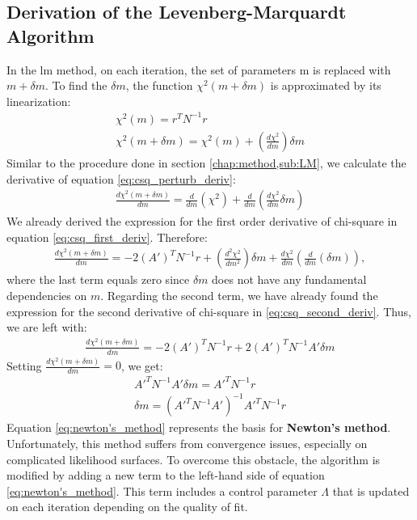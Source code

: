 \documentclass[12pt, TexShade, letterpaper]{report}
\begin{document}
\subsection{Derivation of the Levenberg-Marquardt Algorithm}
In the \gls{lm} method, on each iteration, the set of parameters m is replaced with $m+\delta m$. To find the $\delta m$, the function $\chi^2 (m +\delta m)$ is approximated by its linearization: 
\begin{gather}
    \chi^2 \left(m\right) = r^T N^{-1} r\\
    \chi^2 \left(m + \delta m\right) =  \chi^2 \left(m\right) + \left(\frac{d \chi^2}{dm}\right) \delta m \label{eq:csq_perturb_deriv}
\end{gather}
Similar to the procedure done in section \ref{chap:method,sub:LM}, we calculate the derivative of equation \ref{eq:csq_perturb_deriv}:
\begin{gather}
    \frac{d \chi^2 \left(m +\delta m\right)}{dm} = \frac{d}{dm} \left(\chi^2\right) + \frac{d}{dm} \left(\frac{d\chi^2}{dm} \delta m\right)
\end{gather}
We already derived the expression for the first order derivative of chi-square in equation \ref{eq:csq_first_deriv}. Therefore:
\begin{gather}
   \frac{d \chi^2 \left(m +\delta m\right)}{dm} =  -2 \left(A'\right)^T N^{-1} r + \left(\frac{d^2 \chi^2}{dm^2}\right) \delta m + \frac{d\chi^2}{dm} \left(\frac{d}{dm} (\delta m)\right),
\end{gather}
where the last term equals zero since $\delta m$ does not have any fundamental dependencies on $m$. Regarding the second term, we have already found the expression for the second derivative of chi-square in \ref{eq:csq_second_deriv}. Thus, we are left with:
\begin{gather}
    \frac{d \chi^2 (m +\delta m)}{dm} =  -2 \left(A'\right)^T N^{-1} r + 2 \left(A'\right)^T N^{-1} A'\delta m
\end{gather}
Setting $\frac{d \chi^2 (m +\delta m)}{dm} = 0$, we get:
\begin{gather}
    A'^{T} N^{-1}A' \delta m = A'^T N^{-1} r \\
    \delta m = \left(A'^{T} N^{-1}A'\right)^{-1} A'^T N^{-1} r \label{eq:newton's_method}   
\end{gather}
Equation \ref{eq:newton's_method} represents the basis for \textbf{Newton's method}. Unfortunately, this method suffers from convergence issues, especially on complicated likelihood surfaces. To overcome this obstacle, the algorithm is modified by adding a new term to the left-hand side of equation \ref{eq:newton's_method}. This term includes a control parameter $\Lambda$ that is updated on each iteration depending on the quality of fit. 
\end{document}

